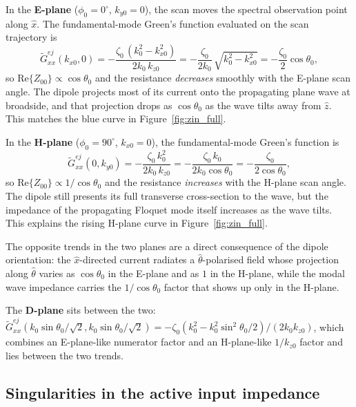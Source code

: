 \documentclass{article}
\begin{document}
In the \textbf{E-plane} ($\phi_0 = 0^\circ$, $k_{y0} = 0$), the scan moves the spectral observation point along $\hat{x}$. The fundamental-mode Green's function evaluated on the scan trajectory is
\begin{equation}
\widetilde{G}_{xx}^{ej}(k_{x0}, 0) = -\frac{\zeta_0\,(k_0^2 - k_{x0}^2)}{2k_0\,k_{z0}} = -\frac{\zeta_0}{2k_0}\,\sqrt{k_0^2 - k_{x0}^2} = -\frac{\zeta_0}{2}\cos\theta_0,
\end{equation}
so $\mathrm{Re}\{Z_{00}\} \propto \cos\theta_0$ and the resistance \emph{decreases} smoothly with the E-plane scan angle. The dipole projects most of its current onto the propagating plane wave at broadside, and that projection drops as $\cos\theta_0$ as the wave tilts away from $\hat{z}$. This matches the blue curve in Figure~\ref{fig:zin_full}.

In the \textbf{H-plane} ($\phi_0 = 90^\circ$, $k_{x0} = 0$), the fundamental-mode Green's function is
\begin{equation}
\widetilde{G}_{xx}^{ej}(0, k_{y0}) = -\frac{\zeta_0\,k_0^2}{2k_0\,k_{z0}} = -\frac{\zeta_0\,k_0}{2k_0\cos\theta_0} = -\frac{\zeta_0}{2\cos\theta_0},
\end{equation}
so $\mathrm{Re}\{Z_{00}\} \propto 1/\cos\theta_0$ and the resistance \emph{increases} with the H-plane scan angle. The dipole still presents its full transverse cross-section to the wave, but the impedance of the propagating Floquet mode itself increases as the wave tilts. This explains the rising H-plane curve in Figure~\ref{fig:zin_full}.

The opposite trends in the two planes are a direct consequence of the dipole orientation: the $\hat{x}$-directed current radiates a $\hat{\theta}$-polarised field whose projection along $\hat{\theta}$ varies as $\cos\theta_0$ in the E-plane and as $1$ in the H-plane, while the modal wave impedance carries the $1/\cos\theta_0$ factor that shows up only in the H-plane.

The \textbf{D-plane} sits between the two: $\widetilde{G}_{xx}^{ej}(k_0\sin\theta_0/\sqrt{2}, k_0\sin\theta_0/\sqrt{2}) = -\zeta_0(k_0^2 - k_0^2 \sin^2\theta_0/2)/(2k_0 k_{z0})$, which combines an E-plane-like numerator factor and an H-plane-like $1/k_{z0}$ factor and lies between the two trends.

\subsection{Singularities in the active input impedance}
\end{document}
